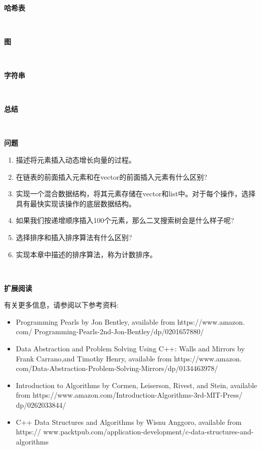 \noindent\textbf{}\ \par
\textbf{哈希表} \ \par

\noindent\textbf{}\ \par
\textbf{图} \ \par

\noindent\textbf{}\ \par
\textbf{字符串} \ \par

\noindent\textbf{}\ \par
\textbf{总结} \ \par

\noindent\textbf{}\ \par
\textbf{问题} \ \par
\begin{enumerate}
	\item 描述将元素插入动态增长向量的过程。
	\item 在链表的前面插入元素和在vector的前面插入元素有什么区别?
	\item 实现一个混合数据结构，将其元素存储在vector和list中。对于每个操作，选择具有最快实现该操作的底层数据结构。
	\item 如果我们按递增顺序插入100个元素，那么二叉搜索树会是什么样子呢?
	\item 选择排序和插入排序算法有什么区别?
	\item 实现本章中描述的排序算法，称为计数排序。
\end{enumerate}

\noindent\textbf{}\ \par
\textbf{扩展阅读} \ \par
有关更多信息，请参阅以下参考资料: \par

\begin{itemize}
	\item Programming Pearls by Jon Bentley, available from  https:/​/​www.​amazon.​com/	Programming-​Pearls-​2nd-​Jon-​Bentley/​dp/​0201657880/​
	\item Data Abstraction and Problem Solving Using C++: Walls and Mirrors by Frank Carrano,and Timothy Henry, available from  https:/​/​www.​amazon.​com/​Data-Abstraction-​Problem-​Solving-​Mirrors/​dp/​0134463978/​
	\item Introduction to Algorithms by Cormen, Leiserson, Rivest, and Stein, available
	from https:/​/​www.​amazon.​com/​Introduction-​Algorithms-​3rd-​MIT-​Press/​dp/0262033844/​
	\item C++ Data Structures and Algorithms by Wisnu Anggoro, available from  https:/​/
	www.​packtpub.​com/​application-​development/​c-​data-​structures-​and-algorithms
\end{itemize}

\newpage







